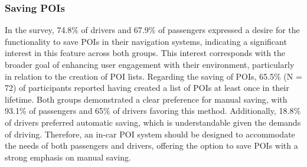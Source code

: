\subsubsection*{\textbf{Saving POIs}}
In the survey, 74.8\% of drivers and 67.9\% of passengers expressed a desire for the functionality to save POIs in their navigation systems, indicating a significant interest in this feature across both groups. This interest corresponds with the broader goal of enhancing user engagement with their environment, particularly in relation to the creation of POI lists. Regarding the saving of POIs, 65.5\% (N = 72) of participants reported having created a list of POIs at least once in their lifetime. Both groups demonstrated a clear preference for manual saving, with 93.1\% of passengers and 65\% of drivers favoring this method. Additionally, 18.8\% of drivers preferred automatic saving, which is understandable given the demands of driving. Therefore, an in-car POI system should be designed to accommodate the needs of both passengers and drivers, offering the option to save POIs with a strong emphasis on manual saving.